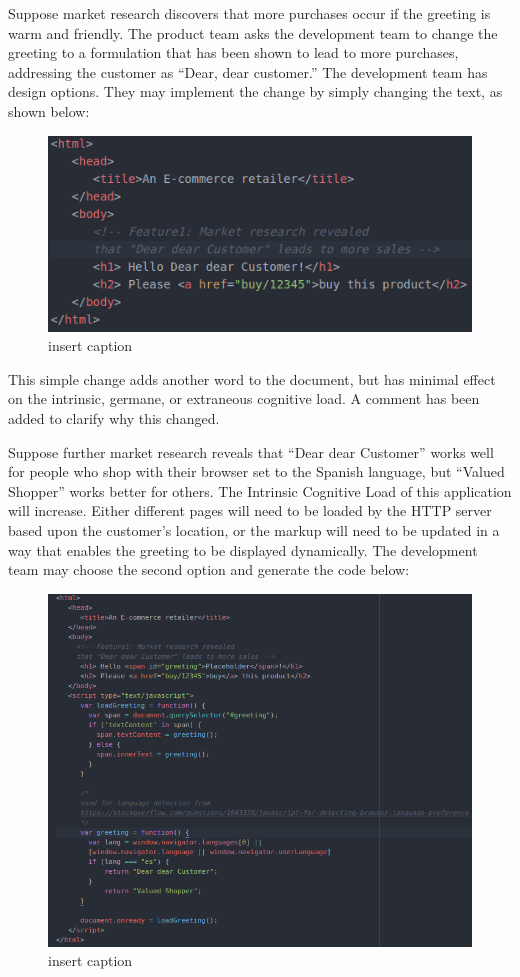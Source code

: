 Suppose market research discovers that more purchases occur if the greeting is warm and friendly. The product team asks the development team to change the greeting to a formulation that has been shown to lead to more purchases, addressing the customer as “Dear, dear customer.” The development team has design options. They may implement the change by simply changing the text, as shown below:

\begin{figure}[H]
	\centering
	\includegraphics[scale=.7]{code2}
	\caption{insert caption}
\end{figure}

This simple change adds another word to the document, but has minimal effect on the intrinsic, germane, or extraneous cognitive load. A comment has been added to clarify why this changed.

Suppose further market research reveals that “Dear dear Customer” works well for people who shop with their browser set to the Spanish language, but “Valued Shopper” works better for others. The Intrinsic Cognitive Load of this application will increase. Either different pages will need to be loaded by the HTTP server based upon the customer’s location, or the markup will need to be updated in a way that enables the greeting to be displayed dynamically. The development team may choose the second option and generate the code below:

\begin{figure}[H]
	\centering
	\includegraphics[width=\linewidth]{code3}
	\caption{insert caption}
\end{figure}

